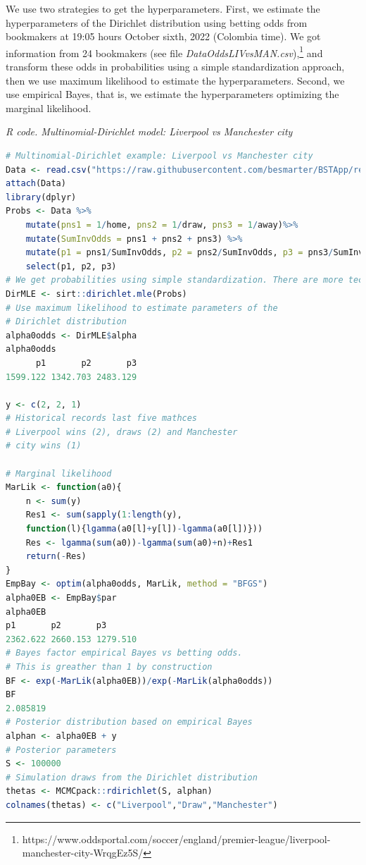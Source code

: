 \begin{enumerate}
We use two strategies to get the hyperparameters. First, we estimate the hyperparameters of the Dirichlet distribution using betting odds from bookmakers at 19:05 hours October sixth, 2022 (Colombia time). We got information from 24 bookmakers (see file \textit{DataOddsLIVvsMAN.csv}),\footnote{https://www.oddsportal.com/soccer/england/premier-league/liverpool-manchester-city-WrqgEz5S/} and transform these odds in probabilities using a simple standardization approach, then we use maximum likelihood to estimate the hyperparameters. Second, we use empirical Bayes, that is, we estimate the hyperparameters optimizing the marginal likelihood.   


\begin{tcolorbox}[enhanced,width=4.67in,center upper,
	fontupper=\large\bfseries,drop shadow southwest,sharp corners]
	\textit{R code. Multinomial-Dirichlet model: Liverpool vs Manchester city}
\begin{VF}
\begin{lstlisting}[language=R]
# Multinomial-Dirichlet example: Liverpool vs Manchester city
Data <- read.csv("https://raw.githubusercontent.com/besmarter/BSTApp/refs/heads/master/DataApp/DataOddsLIVvsMAN.csv", sep = ",", header = TRUE, quote = "")
attach(Data)
library(dplyr)
Probs <- Data %>%
	mutate(pns1 = 1/home, pns2 = 1/draw, pns3 = 1/away)%>% 
	mutate(SumInvOdds = pns1 + pns2 + pns3) %>% 
	mutate(p1 = pns1/SumInvOdds, p2 = pns2/SumInvOdds, p3 = pns3/SumInvOdds) %>% 
	select(p1, p2, p3)
# We get probabilities using simple standardization. There are more technical approaches to do this. See for instance Shin (1993) and Strumbelj (2014). 
DirMLE <- sirt::dirichlet.mle(Probs)
# Use maximum likelihood to estimate parameters of the
# Dirichlet distribution
alpha0odds <- DirMLE$alpha
alpha0odds
      p1       p2       p3 
1599.122 1342.703 2483.129 

y <- c(2, 2, 1) 
# Historical records last five mathces
# Liverpool wins (2), draws (2) and Manchester
# city wins (1)

# Marginal likelihood
MarLik <- function(a0){
	n <- sum(y)
	Res1 <- sum(sapply(1:length(y), 
	function(l){lgamma(a0[l]+y[l])-lgamma(a0[l])}))
	Res <- lgamma(sum(a0))-lgamma(sum(a0)+n)+Res1
	return(-Res)
}
EmpBay <- optim(alpha0odds, MarLik, method = "BFGS")
alpha0EB <- EmpBay$par
alpha0EB
p1       p2       p3 
2362.622 2660.153 1279.510 
# Bayes factor empirical Bayes vs betting odds. 
# This is greather than 1 by construction
BF <- exp(-MarLik(alpha0EB))/exp(-MarLik(alpha0odds))
BF
2.085819
# Posterior distribution based on empirical Bayes
alphan <- alpha0EB + y 
# Posterior parameters 
S <- 100000
# Simulation draws from the Dirichlet distribution 
thetas <- MCMCpack::rdirichlet(S, alphan)
colnames(thetas) <- c("Liverpool","Draw","Manchester")
\end{lstlisting}
\end{VF}
\end{tcolorbox}



\end{enumerate}
